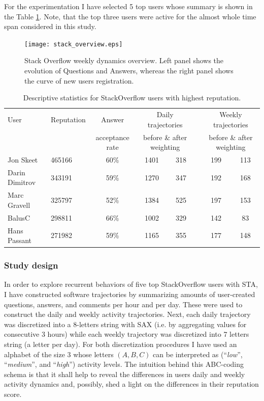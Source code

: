 For the experimentation I have selected 5 top users whose summary is shown in the Table \ref{so_table}. Note, that the top three users were active for the almost whole time span considered in this study.

\begin{figure}
\centering
\texttt{[image: stack\_overview.eps]}
\caption{Stack Overflow weekly dynamics overview. Left panel shows the evolution of Questions and Answers, whereas the right panel shows the curve of new users registration.}
\label{fig:stack_dynamics}   
\end{figure}

\begin{table}[]
\begin{small}
\begin{tabularx}{\linewidth}{l X c c c c c c}
\toprule
User   & Reputation   &   Answer & \multicolumn{2}{c}{Daily  trajectories} & & \multicolumn{2}{c}{Weekly trajectories}\\
& & acceptance rate & \multicolumn{2}{c}{before \& after weighting} & & \multicolumn{2}{c}{before \& after weighting}\\
\midrule
Jon Skeet   & 465166 & 60\% &1401 & 318 & \qquad & 199 & 113 \\
Darin Dimitrov   &  343191 & 59\% & 1270  & 347 & &192 & 168\\
Marc Gravell & 325797 & 52\%  &1384 &525 & &197 & 153 \\
BalusC  & 298811 & 66\% &1002 &329 & &142 & 83 \\
Hans Passant & 271982 & 59\% &1165    &355 & &177 & 148\\
\bottomrule
\end{tabularx}
\caption{Descriptive statistics for StackOverflow users with highest reputation.}
\label{so_table}
\end{small}
\end{table}

\subsubsection{Study design}
In order to explore recurrent behaviors of five top StackOverflow users with STA, I have constructed software trajectories by summarizing amounts of user-created questions, answers, and comments per hour and per day. These were used to construct the daily and weekly activity trajectories. Next, each daily trajectory was discretized into a 8-letters string with SAX (i.e. by aggregating values for consecutive 3 hours) while each weekly trajectory was discretized into 7 letters string (a letter per day). For both discretization procedures I have used an alphabet of the size 3 whose letters $(A,B,C)$ can be interpreted as (``\textit{low}'', ``\textit{medium}'', and ``\textit{high}'') activity levels. The intuition behind this ABC-coding schema is that it shall help to reveal the differences in users daily and weekly activity dynamics and, possibly, shed a light on the differences in their reputation score.

